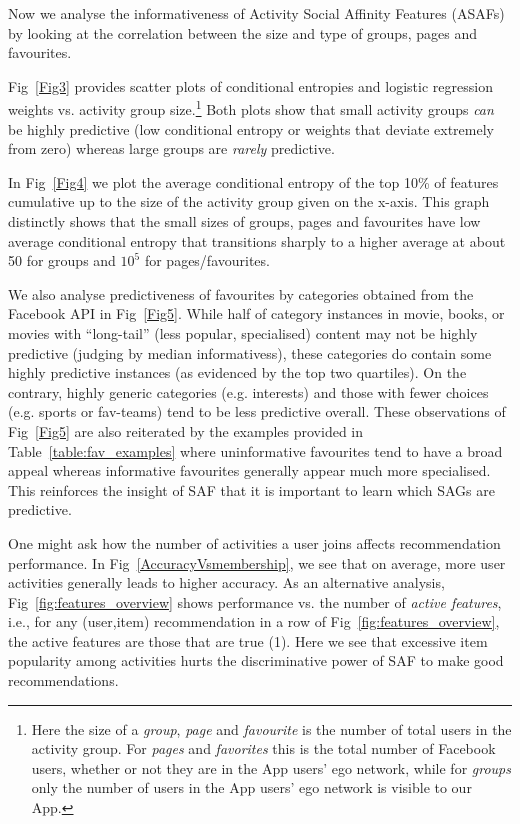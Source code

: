 
Now we analyse the informativeness of Activity Social Affinity
Features (ASAFs) by looking at the correlation between the size and
type of groups, pages and favourites.

Fig~\ref{Fig3} provides scatter plots of conditional
entropies and logistic regression weights vs. activity group 
size.\footnote{Here the size of a {\em group}, {\em page} and {\em favourite}
is the number of total users in the activity group.  For {\em pages}
and {\em favorites} this is the total number of Facebook users,
whether or not they are in the App users' ego network, while for {\em
groups} only the number of users in the App users' ego network is
visible to our App.}  Both plots show that small activity groups
\emph{can} be highly predictive (low conditional entropy or
weights that deviate extremely from zero) whereas large groups are
\emph{rarely} predictive.

In Fig~\ref{Fig4} we plot the average conditional entropy of the top
10\% of features cumulative up to the size of the activity group given
on the x-axis.
This graph distinctly shows that the
small sizes of groups, pages and favourites have low average
conditional entropy that transitions sharply to a higher average 
at about 50 for groups and $10^{5}$ for pages/favourites.

We also analyse predictiveness of favourites by categories obtained
from the Facebook API in Fig~\ref{Fig5}.  While half of category
instances in movie, books, or movies with ``long-tail'' (less popular,
specialised) content may not be highly predictive (judging by median
informativess), these categories do contain some highly predictive
instances (as evidenced by the top two quartiles).  On the contrary,
highly generic categories (e.g. interests) and those with fewer
choices (e.g. sports or fav-teams) tend to be less predictive overall.
These observations of Fig~\ref{Fig5} are also reiterated by the
examples provided in Table~\ref{table:fav_examples} where
uninformative favourites tend to have a broad appeal whereas
informative favourites generally appear much more specialised.  This
reinforces the insight of SAF that it is important to learn
which SAGs are predictive.
   
One might ask how the number of activities a user joins affects
recommendation performance.  In Fig~\ref{AccuracyVsmembership}, we see
that on average, more user activities generally leads to higher
accuracy.  As an alternative analysis, Fig~\ref{fig:features_overview}
shows performance vs.  the number of \emph{active features}, i.e., for
any (user,item) recommendation in a row of
Fig~\ref{fig:features_overview}, the active features are those that
are true (1).  Here we see that excessive item popularity among
activities hurts the discriminative power of SAF to make good
recommendations.

